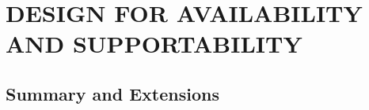 \chapter{DESIGN FOR AVAILABILITY AND SUPPORTABILITY}\label{chap:18}


\section{Summary and Extensions}

